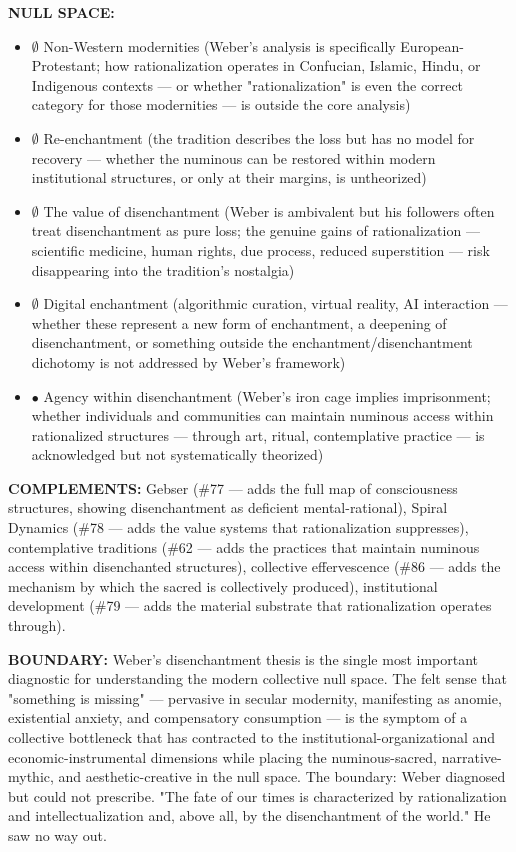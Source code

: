 \textbf{NULL SPACE:}

\begin{itemize}[nosep,leftmargin=*]
  \item $\emptyset$ Non-Western modernities (Weber's analysis is specifically European-Protestant; how rationalization operates in Confucian, Islamic, Hindu, or Indigenous contexts — or whether "rationalization" is even the correct category for those modernities — is outside the core analysis)
  \item $\emptyset$ Re-enchantment (the tradition describes the loss but has no model for recovery — whether the numinous can be restored within modern institutional structures, or only at their margins, is untheorized)
  \item $\emptyset$ The value of disenchantment (Weber is ambivalent but his followers often treat disenchantment as pure loss; the genuine gains of rationalization — scientific medicine, human rights, due process, reduced superstition — risk disappearing into the tradition's nostalgia)
  \item $\emptyset$ Digital enchantment (algorithmic curation, virtual reality, AI interaction — whether these represent a new form of enchantment, a deepening of disenchantment, or something outside the enchantment/\allowbreak disenchantment dichotomy is not addressed by Weber's framework)
  \item $\bullet$ Agency within disenchantment (Weber's iron cage implies imprisonment; whether individuals and communities can maintain numinous access within rationalized structures — through art, ritual, contemplative practice — is acknowledged but not systematically theorized)
\end{itemize}


\textbf{COMPLEMENTS:} Gebser (\#77 — adds the full map of consciousness structures, showing disenchantment as deficient mental-rational), Spiral Dynamics (\#78 — adds the value systems that rationalization suppresses), contemplative traditions (\#62 — adds the practices that maintain numinous access within disenchanted structures), collective effervescence (\#86 — adds the mechanism by which the sacred is collectively produced), institutional development (\#79 — adds the material substrate that rationalization operates through).


\textbf{BOUNDARY:} Weber's disenchantment thesis is the single most important diagnostic for understanding the modern collective null space. The felt sense that "something is missing" — pervasive in secular modernity, manifesting as anomie, existential anxiety, and compensatory consumption — is the symptom of a collective bottleneck that has contracted to the institutional-organizational and economic-instrumental dimensions while placing the numinous-sacred, narrative-mythic, and aesthetic-creative in the null space. The boundary: Weber diagnosed but could not prescribe. "The fate of our times is characterized by rationalization and intellectualization and, above all, by the disenchantment of the world." He saw no way out.


